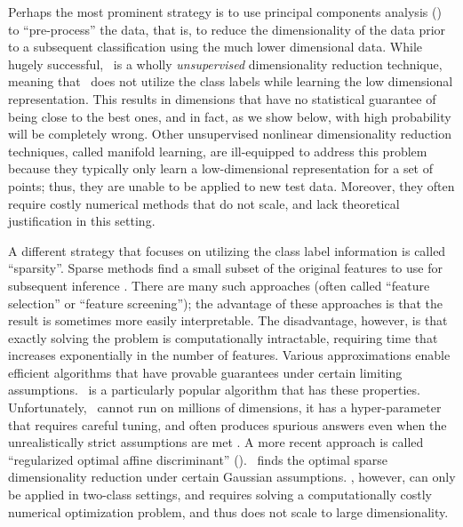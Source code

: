 \documentclass[10pt]{article}
\begin{document}
Perhaps the most prominent strategy is to use principal components analysis (\Pca) \cite{Jolliffe1986} to ``pre-process'' the data, that is, to reduce the dimensionality of the data prior to a subsequent classification using the much lower dimensional data.  While hugely successful, \Pca~is a wholly \emph{unsupervised} dimensionality reduction technique, meaning that \Pca~does not utilize the class labels while learning the low dimensional representation.  This results in dimensions that have no statistical guarantee of being close to the best ones, and in fact, as we show below, with high probability will be completely wrong.  Other unsupervised nonlinear dimensionality reduction techniques,  called manifold learning, are ill-equipped to address this problem because they typically only learn a low-dimensional representation for a set of points; thus, they are unable to be applied to  new test data.   Moreover, they often require costly numerical methods that do not scale, and lack theoretical justification in this setting. 





A different strategy that focuses on utilizing the class label information is called  ``sparsity''. Sparse methods  find a small subset of the original features to use for subsequent inference \cite{Hastie2015}. There are many such approaches (often called ``feature selection'' or ``feature screening''); the advantage of these approaches is that the result is sometimes more easily interpretable.  The disadvantage, however, is that exactly solving the problem is computationally intractable, requiring time that increases exponentially in the number of features.  Various approximations enable efficient algorithms that have provable guarantees under certain limiting assumptions.  \Lasso~is a particularly popular algorithm that has these properties. Unfortunately, \Lasso~cannot run on millions of dimensions,  it has a hyper-parameter that requires careful tuning, and  often produces spurious answers even when the unrealistically strict assumptions are met \cite{Su2015}.
A more recent approach is called ``regularized optimal affine discriminant'' (\Road). \Road~finds the optimal sparse dimensionality reduction under certain Gaussian assumptions.  \Road, however, can only be applied in two-class settings, and requires solving a computationally costly numerical optimization problem, and thus does not scale to large dimensionality.
\end{document}
